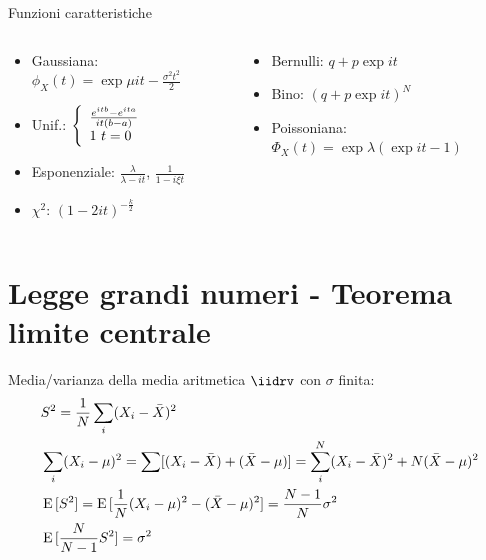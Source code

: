 \documentclass[asd-beamer.tex]{subfiles}%
\begin{document}
\begin{wordonframe}{Funzioni caratteristiche}
\begin{columns}[T]
	\begin{column}{0.5\textwidth}
        \begin{itemize}
            \item Gaussiana: $\phi_X(t)=\exp{\mu it-\frac{\sigma^2t^2}{2}}$
            \item Unif.: $\lbt{\frac{\exp{itb}-\exp{ita}}{it(b-a)}}{1\ t=0}$
            \item Esponenziale: $\frac{\lambda}{\lambda-it}$, $\frac{1}{1-i\xi t}$
            \item $\chi^2$: $(1-2it)^{-\frac{k}{2}}$
        \end{itemize}
	\end{column}
	\begin{column}{0.5\textwidth}
        \begin{itemize}
            \item Bernulli: $q+p\exp{it}$
            \item Bino: $(q+p\exp{it})^N$
            \item Poissoniana: $\Phi_X(t)=\exp{\lambda(\exp{it}-1)}$
        \end{itemize}
	\end{column}
\end{columns}
\end{wordonframe}

\section{Legge grandi numeri - Teorema limite centrale}

\begin{frame}{Media/varianza della media aritmetica}
    $\iidrv$ con $\sigma$ finita:
    \begin{align*}
        &S^2=\frac{1}{N}\sum_i(X_i-\bar{X})^2\\
        &\sum_i(X_i-\mu)^2=\sum[(X_i-\bar{X})+(\bar{X}-\mu)]=\sum_i^N(X_i-\bar{X})^2+N(\bar{X}-\mu)^2\\
        &\operatorname{E}{[S^2]}=\operatorname{E}{[\frac{1}{N}(X_i-\mu)^2-(\bar{X}-\mu)^2]}=\frac{N-1}{N}\sigma^2\\
        &\operatorname{E}{[\frac{N}{N-1}S^2]}=\sigma^2
    \end{align*}
\end{frame}
\end{document}
